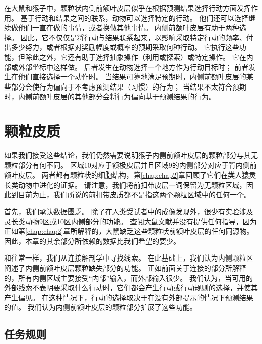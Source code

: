 在大鼠和猴子中，颗粒状内侧前额叶皮层似乎在根据预测结果选择行动方面发挥作用。
基于行动和结果之间的联系，动物可以选择特定的行动。
他们还可以选择继续做他们一直在做的事情，或者换做其他事情。
内侧前额叶皮层有助于两种选择。
因此，它不仅仅是将行动与结果联系起来，以影响采取特定行动的频率、付出多少努力，或者根据对奖励幅度或概率的预期采取何种行动。
它执行这些功能，但除此之外，它还有助于选择抽象操作（利用或探索）或特定操作。
它在内部或外部坐标中这样做。
后者发生在动物选择一个地方作为行动目标时； 前者发生在他们直接选择一个动作时。
当结果可靠地满足预期时，内侧前额叶皮层的某些部分会使行为偏向于不考虑预测结果（习惯）的行为；
当结果不太符合预期时，内侧前额叶皮层的其他部分会将行为偏向基于预测结果的行为。\par



\section{颗粒皮质}

如果我们接受这些结论，我们仍然需要说明猴子内侧前额叶皮层的颗粒部分与其无颗粒部分有何不同。
区域10对应于额极皮层并且区域9的内侧部分对应于背内侧前额叶皮层。
两者都有颗粒状的细胞结构，第\ref{chap:chap2}章回顾了它们在类人猿灵长类动物中进化的证据。
请注意，我们将前扣带皮层一词保留为无颗粒区域，因此到目前为止，我们所说的前扣带皮质都不是指这两个颗粒区域中的任何一个。\par


首先，我们承认数据匮乏。
除了在人类受试者中的成像发现外，很少有实验涉及灵长类动物9区或10区内侧部分的功能。
查阅大鼠文献并没有提供任何指导，因为正如第\ref{chap:chap2}章所解释的，大鼠缺乏这些颗粒状前额叶皮层的任何同源物。
因此，本章的其余部分所依赖的数据比我们希望的要少。\par


和往常一样，我们从连接解剖学中寻找线索。
在此基础上，我们认为内侧颗粒区阐述了内侧前额叶皮层颗粒缺失部分的功能。
正如前面关于连接的部分所解释的，所有内侧区域主要接受“内部”输入，而外部输入很少。
我们认为，当可用的外部线索不表明要采取什么行动时，它们都会产生行动或行动规则的选择，并使其产生偏见。
在这种情况下，行动的选择取决于在没有外部提示的情况下预测结果的值。
我们认为内侧前额叶皮层的颗粒部分扩展了这些功能。\par



\subsection{任务规则}

